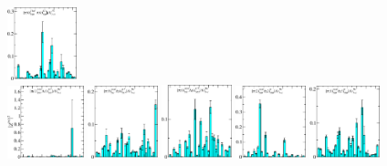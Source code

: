 \begin{figure}[H]
    \includegraphics[width=0.18\textwidth]{figures/sigmas/hu/zfactors/zfactor_isotriplet_pion_lambda-Hu_1-P000-T1up-SS_0-P000-G1g-SS_0.pdf}\\
    \includegraphics[width=0.1975\textwidth]{figures/sigmas/hu/zfactors/zfactor_isotriplet_pion_lambda-Hu_1-P010-A2m-SS_0-P0-10-G1-SS_1.pdf}
    \includegraphics[width=0.18\textwidth]{figures/sigmas/hu/zfactors/zfactor_isotriplet_pion_lambda-Hu_1-P010-A2m-SS_1-P0-10-G1-SS_1.pdf}
    \includegraphics[width=0.18\textwidth]{figures/sigmas/hu/zfactors/zfactor_isotriplet_pion_lambda-Hu_1-P010-A2m-SS_1-P0-10-G1-SS_2.pdf}
    \includegraphics[width=0.18\textwidth]{figures/sigmas/hu/zfactors/zfactor_isotriplet_pion_lambda-Hu_1-P011-A2m-SS_0-P0-1-1-G-SS_0.pdf}
    \includegraphics[width=0.18\textwidth]{figures/sigmas/hu/zfactors/zfactor_isotriplet_pion_lambda-Hu_1-P111-A2m-SS_0-P-1-1-1-G-SS_0.pdf}\\

\end{figure}
